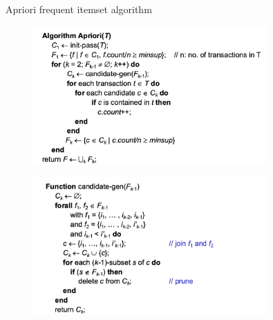\documentclass[12pt,oneside,a4paper]{article}
\begin{document}
Apriori frequent itemset algorithm
\begin{figure}[H]
    \centering
    \includegraphics[width=0.8\textwidth]{Images/Apriori.png}
\end{figure}
\begin{figure}[H]
    \centering
    \includegraphics[width=0.8\textwidth]{Images/Candidate_gen_apriori.png}
\end{figure}
\end{document}
